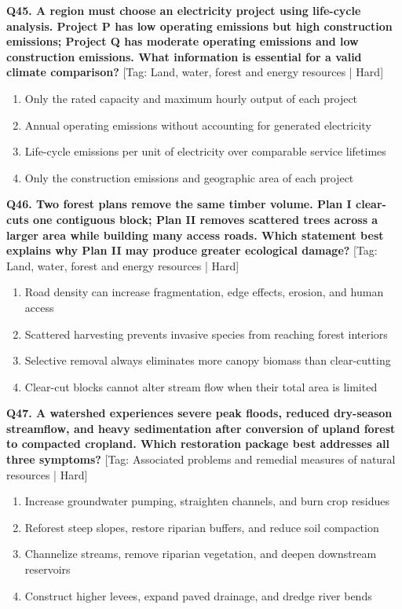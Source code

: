 \noindent\textbf{Q45. A region must choose an electricity project using life-cycle analysis. Project P has low operating emissions but high construction emissions; Project Q has moderate operating emissions and low construction emissions. What information is essential for a valid climate comparison?} \hfill [Tag: Land, water, forest and energy resources | Hard]
\begin{enumerate}[label=(\alph*),topsep=2pt,itemsep=1pt,partopsep=0pt,parsep=0pt]
    \item {Only the rated capacity and maximum hourly output of each project}
    \item {Annual operating emissions without accounting for generated electricity}
    \item {Life-cycle emissions per unit of electricity over comparable service lifetimes}
    \item {Only the construction emissions and geographic area of each project}
\end{enumerate}
\vspace{2mm}

\noindent\textbf{Q46. Two forest plans remove the same timber volume. Plan I clear-cuts one contiguous block; Plan II removes scattered trees across a larger area while building many access roads. Which statement best explains why Plan II may produce greater ecological damage?} \hfill [Tag: Land, water, forest and energy resources | Hard]
\begin{enumerate}[label=(\alph*),topsep=2pt,itemsep=1pt,partopsep=0pt,parsep=0pt]
    \item {Road density can increase fragmentation, edge effects, erosion, and human access}
    \item {Scattered harvesting prevents invasive species from reaching forest interiors}
    \item {Selective removal always eliminates more canopy biomass than clear-cutting}
    \item {Clear-cut blocks cannot alter stream flow when their total area is limited}
\end{enumerate}
\vspace{2mm}

\noindent\textbf{Q47. A watershed experiences severe peak floods, reduced dry-season streamflow, and heavy sedimentation after conversion of upland forest to compacted cropland. Which restoration package best addresses all three symptoms?} \hfill [Tag: Associated problems and remedial measures of natural resources | Hard]
\begin{enumerate}[label=(\alph*),topsep=2pt,itemsep=1pt,partopsep=0pt,parsep=0pt]
    \item {Increase groundwater pumping, straighten channels, and burn crop residues}
    \item {Reforest steep slopes, restore riparian buffers, and reduce soil compaction}
    \item {Channelize streams, remove riparian vegetation, and deepen downstream reservoirs}
    \item {Construct higher levees, expand paved drainage, and dredge river bends}
\end{enumerate}
\vspace{2mm}

